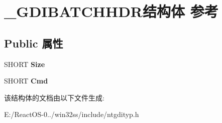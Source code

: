 \hypertarget{struct___g_d_i_b_a_t_c_h_h_d_r}{}\section{\+\_\+\+G\+D\+I\+B\+A\+T\+C\+H\+H\+D\+R结构体 参考}
\label{struct___g_d_i_b_a_t_c_h_h_d_r}
\subsection*{Public 属性}
\begin{DoxyCompactItemize}
\item 
\mbox{\label{struct___g_d_i_b_a_t_c_h_h_d_r_a4ae3b5e5aeefb1a837d19e1a3aa263f7}} 
S\+H\+O\+RT {\bfseries Size}
\item 
\mbox{\label{struct___g_d_i_b_a_t_c_h_h_d_r_a87b3152516ac4ecd4c89d45c752723be}} 
S\+H\+O\+RT {\bfseries Cmd}
\end{DoxyCompactItemize}


该结构体的文档由以下文件生成\+:\begin{DoxyCompactItemize}
\item 
E\+:/\+React\+O\+S-\/0../win32ss/include/ntgdityp.\+h\end{DoxyCompactItemize}

